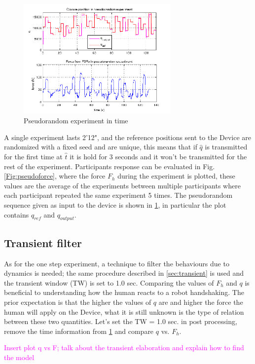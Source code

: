 \begin{figure}[h]
  \centering
\includegraphics[width=0.7\textwidth]{Figure/pseudorandom_q.png}
  \caption{Pseudorandom experiment in time}
  \label{Fig:pseudo}
\end{figure}


A single experiment lasts 2'12", and the reference positions sent to the Device are randomized with a fixed seed and are unique, this means that if $\hat{q}$ is transmitted for the first time at $\hat{t}$ it is hold for 3 seconds and it won't be transmitted for the rest of the experiment.
Participants response can be evaluated in Fig. \ref{Fig:pseudoforce}, where the force $F_{h}$ during the experiment is plotted, these values are the average of the experiments between multiple participants where each participant repeated the same experiment 5 times.
The pseudorandom sequence given as input to the device is shown in \ref{Fig:pseudo}, in particular the plot contains $q_{ref}$ and $q_{output}$.\\
%

\subsection{Transient filter}\label{sec:transientPseudo}
As for the one step experiment, a technique to filter the behaviours due to dynamics is needed; the same procedure described in \ref{sec:transient} is used and the transient window (TW) is set to 1.0 sec.
Comparing the values of $F_{h}$ and $q$ is beneficial to understanding how the human reacts to a robot handshaking. The prior expectation is that the higher the values of $q$ are and higher the force the human will apply on the Device, what it is still unknown is the type of relation between these two quantities. Let's set the TW = 1.0 sec. in post processing, remove the time information from  \ref{Fig:pseudo} and compare  $q$ vs. $F_{h}$.



\textcolor{magenta}{Insert plot q vs F; talk about the transient elaboration and explain how to find the model}
